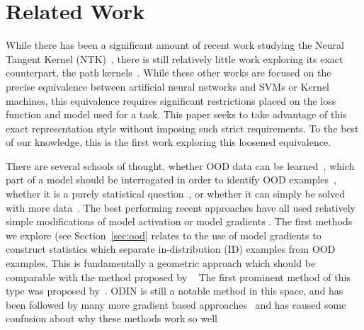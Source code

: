 
\section{Related Work}
While there has been a significant amount of recent work studying the Neural Tangent Kernel (NTK)~\citep{jacot2018neural}, there is still relatively little work exploring its exact counterpart, the path kernels~\citep{bell2023, chen2021equivalence, domingos2020}. While these other works are focused on the precise equivalence between artificial neural networks and SVMs or Kernel machines, this equivalence requires significant restrictions placed on the loss function and model used for a task. This paper seeks to take advantage of this exact representation style without imposing such strict requirements. To the best of our knowledge, this is the first work exploring this loosened equivalence. 


There are several schools of thought, whether OOD data can be learned~\citep{huang2021scaling, mohseni2020, he2015, pillai2013, fumera2002}, which part of a model should be interrogated in order to identify OOD examples~\citep{liu2020, lin2021}, whether it is a purely statistical question~\citep{lee2018}, or whether it can simply be solved with more data~\citep{chen2021atom, de_silva_value_2023}. The best performing recent approaches have all used relatively simple modifications of model activation or model gradients \citep{djurisic2023, xu2023vra, sun2022, sun2021}. The first methods we explore (see Section~\ref{sec:ood} relates to the use of model gradients to construct statistics which separate in-distribution (ID) examples from OOD examples. This is fundamentally a geometric approach which should be comparable with the method proposed by \citet{sun2022deep}~\citep{gillette2022data} The first prominent method of this type was proposed by~\citet{liang2018}. ODIN is still a notable method in this space, and has been followed by many more gradient based approaches~\citep{behpour2023, huang2021gradients} and has caused some confusion about why these methods work so well~\citep{igoe2022}

